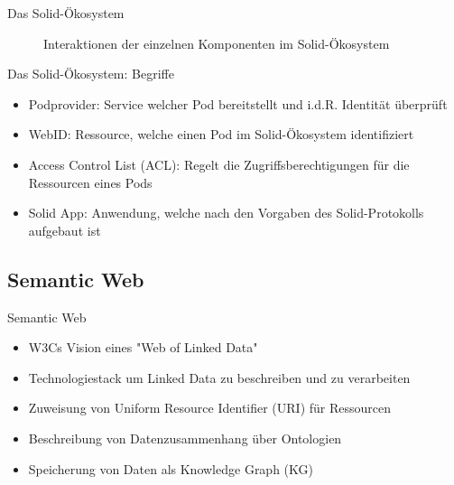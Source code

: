 \documentclass{beamer}              %
\begin{document}
\begin{frame}{Das Solid-Ökosystem}
\begin{figure}[htbp]
  
  \caption{Interaktionen der einzelnen Komponenten im Solid-Ökosystem\cite{soliddeblackboxed}}
\end{figure}

\end{frame}

\begin{frame}{Das Solid-Ökosystem: Begriffe}
\begin{itemize}
    \item Podprovider: Service welcher Pod bereitstellt und i.d.R. Identität überprüft \cite{sambra2016solid}
    \item WebID: Ressource, welche einen Pod im Solid-Ökosystem identifiziert
    \item Access Control List (ACL): Regelt die Zugriffsberechtigungen für die Ressourcen eines Pods
    \item Solid App: Anwendung, welche nach den Vorgaben des Solid-Protokolls aufgebaut ist
\end{itemize}
\end{frame}

\subsection{Semantic Web}
\begin{frame}{Semantic Web}
\begin{itemize}
    \item W3Cs Vision eines "Web of Linked Data" \cite{bernerslee1998semanticwebroadmap}
    \item Technologiestack um Linked Data zu beschreiben und zu verarbeiten
    \item Zuweisung von Uniform Resource Identifier (URI) für Ressourcen \cite{blumauer2006semantic}
    \item Beschreibung von Datenzusammenhang über Ontologien \cite{staab2009handbook}
    \item Speicherung von Daten als Knowledge Graph (KG) \cite{blumauer2006semantic}
\end{itemize}
\end{frame}
\end{document}
